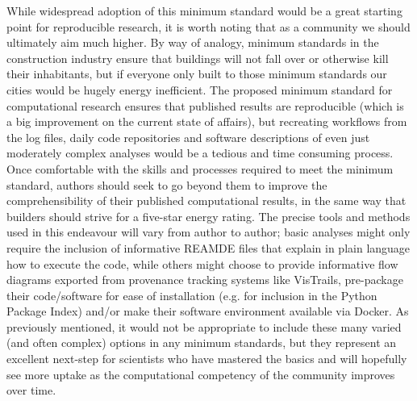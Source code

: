 While widespread adoption of this minimum standard would be a great starting point for reproducible research, it is worth noting that as a community we should ultimately aim much higher. By way of analogy, minimum standards in the construction industry ensure that buildings will not fall over or otherwise kill their inhabitants, but if everyone only built to those minimum standards our cities would be hugely energy inefficient. The proposed minimum standard for computational research ensures that published results are reproducible (which is a big improvement on the current state of affairs), but recreating workflows from the log files, daily code repositories and software descriptions of even just moderately complex analyses would be a tedious and time consuming process. Once comfortable with the skills and processes required to meet the minimum standard, authors should seek to go beyond them to improve the comprehensibility of their published computational results, in the same way that builders should strive for a five-star energy rating. The precise tools and methods used in this endeavour will vary from author to author; basic analyses might only require the inclusion of informative REAMDE files that explain in plain language how to execute the code, while others might choose to provide informative flow diagrams exported from provenance tracking systems like VisTrails, pre-package their code/software for ease of installation (e.g. for inclusion in the Python Package Index) and/or make their software environment available via Docker. As previously mentioned, it would not be appropriate to include these many varied (and often complex) options in any minimum standards, but they represent an excellent next-step for scientists who have mastered the basics and will hopefully see more uptake as the computational competency of the community improves over time.

  







